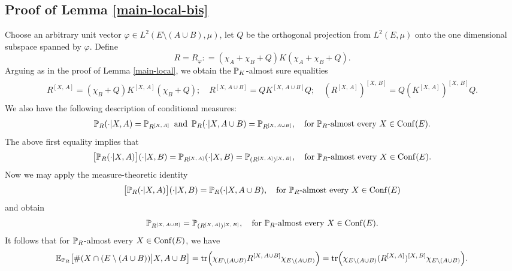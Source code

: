 \documentclass[12pt]{paper}
\numberwithin{theorem}{section}
\numberwithin{figure}{section}
\numberwithin{equation}{section}
\begin{document}
\subsection{Proof of Lemma \ref{main-local-bis}}
 Choose an arbitrary unit vector $\varphi \in L^2(E \setminus (A \cup B), \mu)$, let $Q$ be the orthogonal projection from $L^2(E, \mu)$ onto the one dimensional subspace spanned by $\varphi$. Define
 \[
 R = R_\varphi: = (\chi_A + \chi_B + Q) K (\chi_A + \chi_B + Q).
 \]
 Arguing as in the proof of Lemma \ref{main-local}, we obtain the $\mathbb{P}_K$-almost sure equalities
 \begin{align}\label{as-kernel}
 \begin{split}
 R^{[X,\, A]} =  (\chi_B + Q) K^{[X,\, A]}(\chi_B + Q);  \quad  R^{[ X, \,  A \cup B ] } =   Q K^{[X,  \, A \cup B]}  Q;  \quad (R^{[X,\, A]})^{ [X,\, B]} =   Q (K^{[X,\, A]})^{ [X,\, B]}  Q.
  \end{split}
 \end{align}
We also have the following description of conditional measures:
 \begin{align*}
 \mathbb{P}_R (\cdot |   X,  A ) = \mathbb{P}_{ R^{[X, \, A]}} \text{\, and \,}
 \mathbb{P}_R (\cdot |   X, A\cup B ) = \mathbb{P}_{ R^{[X, \,  A \cup B ]}}, \quad \text{for $\mathbb{P}_R$-almost every $X\in \mathrm{Conf}(E)$.}
 \end{align*}
The above first equality implies that
 \begin{align*}
 \big[ \mathbb{P}_R (\cdot |   X, A )\big](\cdot | X, B ) = \mathbb{P}_{ R^{[X,\, A]}}(\cdot | X, B )  = \mathbb{P}_{(R^{[X,\, A]})^{ [X,\, B]}}, \quad \text{for $\mathbb{P}_R$-almost every $X\in \mathrm{Conf}(E)$.}
 \end{align*}
Now we may apply the measure-theoretic identity
\begin{align*}
 \big[ \mathbb{P}_R (\cdot |    X, A )\big](\cdot |X, B )  = \mathbb{P}_R (\cdot |   X, A\cup B ), \quad \text{for $\mathbb{P}_R$-almost every $X\in \mathrm{Conf}(E)$}
\end{align*}
and obtain
 \begin{align}\label{identity-prob}
  \mathbb{P}_{ R^{[X, \,  A \cup B ]}} = \mathbb{P}_{(R^{[X,\, A]})^{ [X,\, B]}}, \quad \text{for $\mathbb{P}_R$-almost every $X\in \mathrm{Conf}(E)$.}
 \end{align}
It follows that for $\mathbb{P}_R$-almost every $X\in \mathrm{Conf}(E)$, we have
 \begin{align*}
 \mathbb{E}_{\mathbb{P}_R} \big[  \# ( X \cap (E \setminus (A \cup B)) \big|  X, A \cup B\big]  = \mathrm{tr} \Big( \chi_{E \setminus (A\cup B)} R^{[X, \, A \cup B ]}  \chi_{E \setminus (A\cup B)} \Big) = \mathrm{tr} \Big( \chi_{E \setminus (A\cup B)}   (R^{[X,\, A]})^{ [X,\, B]}   \chi_{E \setminus (A\cup B)} \Big).
 \end{align*}
\end{document}
